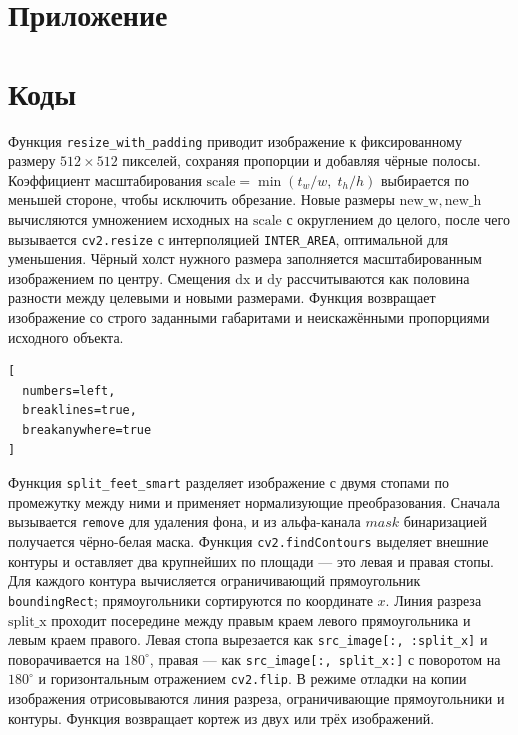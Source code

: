 \documentclass[coursework]{SCWorks}
\begin{document}



\appendix


\section{Приложение}
\section{Коды}



Функция \texttt{resize\_with\_padding} приводит изображение к фиксированному
размеру $512\times512$ пикселей, сохраняя пропорции и добавляя чёрные полосы.
Коэффициент масштабирования $\mathrm{scale} = \min(t_w / w,\; t_h / h)$
выбирается по меньшей стороне, чтобы исключить обрезание. Новые размеры
$\mathrm{new\_w}, \mathrm{new\_h}$ вычисляются умножением исходных на
$\mathrm{scale}$ с округлением до целого, после чего вызывается \texttt{cv2.resize}
с интерполяцией \texttt{INTER\_AREA}, оптимальной для уменьшения. Чёрный холст
нужного размера заполняется масштабированным изображением по центру. Смещения
$\mathrm{dx}$ и $\mathrm{dy}$ рассчитываются как половина разности между
целевыми и новыми размерами. Функция возвращает изображение со строго
заданными габаритами и неискажёнными пропорциями исходного объекта.

\begin{Verbatim}[
  numbers=left,
  breaklines=true,
  breakanywhere=true
]

\end{Verbatim}

Функция \texttt{split\_feet\_smart} разделяет изображение с двумя стопами по промежутку
между ними и применяет нормализующие преобразования. Сначала вызывается
\texttt{remove} для удаления фона, и из альфа-канала $mask$ бинаризацией
получается чёрно-белая маска. Функция \texttt{cv2.findContours} выделяет
внешние контуры и оставляет два крупнейших по площади --- это левая и правая
стопы. Для каждого контура вычисляется ограничивающий прямоугольник
\texttt{boundingRect}; прямоугольники сортируются по координате $x$. Линия
разреза $\mathrm{split\_x}$ проходит посередине между правым краем левого
прямоугольника и левым краем правого. Левая стопа вырезается как
\texttt{src\_image[:, :split\_x]} и поворачивается на $180^\circ$, правая ---
как \texttt{src\_image[:, split\_x:]} с поворотом на $180^\circ$ и
горизонтальным отражением \texttt{cv2.flip}. В режиме отладки на копии
изображения отрисовываются линия разреза, ограничивающие прямоугольники и
контуры. Функция возвращает кортеж из двух или трёх изображений.
\end{document}
